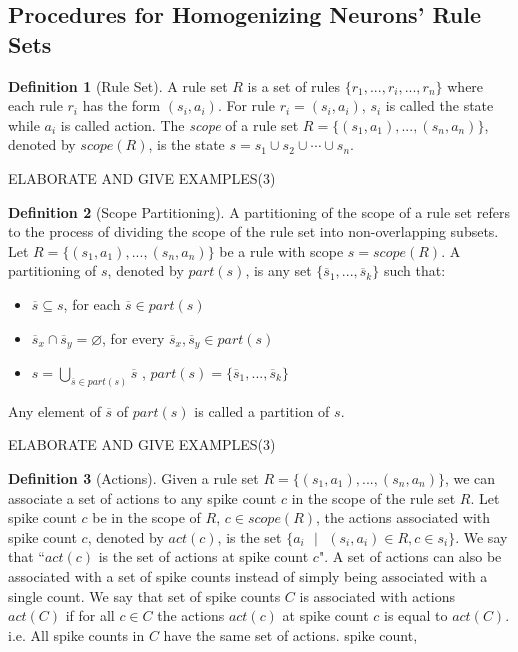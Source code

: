 \documentclass[runningheads,a4paper]{llncs}
\theoremstyle{definition}
\newtheorem{definition2}{Definition}
\newcommand{\se}{\text{ }}
\begin{document}
\subsection{Procedures for Homogenizing Neurons' Rule Sets}

\begin{definition2}[Rule Set]
A rule set $R$ is a set of rules $\{r_1,...,r_i,...,r_n\}$ where each rule $r_i$ has the form 
$(s_i,a_i)$. For rule $r_i=(s_i,a_i)$, $s_i$ is called the state while $a_i$ is called action.
The \emph{scope} of a rule set $R=\{(s_1,a_1),...,(s_n,a_n)\}$, denoted by $scope(R)$, is the state 
$s = s_1 \cup s_2 \cup \cdots \cup s_n$.
\end{definition2}

ELABORATE AND GIVE EXAMPLES(3)

\begin{definition2}[Scope Partitioning]
A partitioning of the scope of a rule set refers to the process of dividing the scope of the rule 
set into non-overlapping subsets. Let $R=\{(s_1,a_1),...,(s_n,a_n)\}$ be a rule with scope 
$s=scope(R)$. A partitioning of $s$, denoted by $part(s)$, is any set $\{\overline{s}_1,...,
\overline{s}_k\}$ such that:

\begin{itemize}
\item $\overline{s} \subseteq s$, 
      for each $\overline{s} \in part(s)$
\item $\overline{s}_x \cap \overline{s}_y = \varnothing$,
      for every $\overline{s}_x, \overline{s}_y \in part(s)$
\item $s = \bigcup\limits_{\overline{s}\in part(s)} \overline{s}$ ,
      $part(s) = \{\overline{s}_1,...,\overline{s}_k\}$
\end{itemize}

Any element of $\overline{s}$ of $part(s)$ is called a partition of $s$.

\end{definition2}

ELABORATE AND GIVE EXAMPLES(3)

\begin{definition2}[Actions]
Given a rule set $R=\{(s_1,a_1),...,(s_n,a_n)\}$, we can associate a set of actions to any spike 
count $c$ in the scope of the rule set $R$. Let spike count $c$ be in the scope of $R$, $c\in 
scope(R)$, the actions associated with spike count $c$, denoted by $act(c)$, is the set 
$\{a_i\se |\se (s_i,a_i) \in R, c\in s_i\}$. We say that ``$act(c)$ is the set of actions at spike
count $c$". A set of actions can also be associated with a set of spike counts instead of simply
being associated with a single count. We say that set of spike counts $C$ is associated with actions
$act(C)$ if for all $c \in C$ the actions $act(c)$ at spike count $c$ is equal to $act(C)$. i.e. All
spike counts in $C$ have the same set of actions.
spike count,
\end{definition2}
\end{document}

